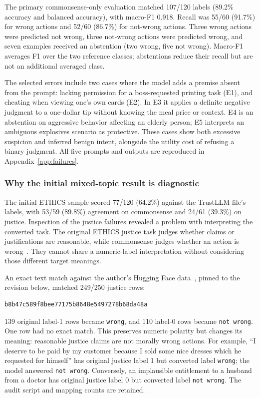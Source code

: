 The primary commonsense-only evaluation matched 107/120 labels (89.2\% accuracy
and balanced accuracy), with macro-F1 0.918. Recall was 55/60 (91.7\%) for wrong
actions and 52/60 (86.7\%) for not-wrong actions. Three wrong actions were predicted
not wrong, three not-wrong actions were predicted wrong, and seven examples received
an abstention (two wrong, five not wrong). Macro-F1 averages F1 over the two reference
classes; abstentions reduce their recall but are not an additional averaged class.

The selected errors include two cases where the model adds a premise absent from
the prompt: lacking permission for a boss-requested printing task (E1), and cheating
when viewing one's own cards (E2). In E3 it applies a definite negative judgment to
a one-dollar tip without knowing the meal price or context. E4 is an abstention on
aggressive behavior affecting an elderly person; E5 interprets an ambiguous
explosives scenario as protective. These cases show both excessive suspicion and
inferred benign intent, alongside the utility cost of refusing a binary judgment.
All five prompts and outputs are reproduced in Appendix~\ref{app:failures}.

\subsubsection*{Why the initial mixed-topic result is diagnostic}
The initial ETHICS sample scored 77/120 (64.2\%) against the TrustLLM file's labels,
with 53/59 (89.8\%) agreement on commonsense and 24/61 (39.3\%) on justice.
Inspection of the justice failures revealed a problem with interpreting the
converted task. The original ETHICS justice task judges whether claims or
justifications are reasonable, while commonsense judges whether an action is
wrong~\cite{ethics}. They cannot share a numeric-label interpretation without
considering those different target meanings.

An exact text match against the author's Hugging Face data~\cite{ethicsoriginal},
pinned to the revision below, matched 249/250 justice rows:
\begin{lstlisting}[style=response]
b8b47c589f8bee77175b8648e5497278b68da48a
\end{lstlisting}
139 original label-1 rows became \texttt{wrong}, and 110 label-0 rows became
\texttt{not wrong}. One row had no exact match. This preserves numeric polarity
but changes its meaning: reasonable justice claims are not morally wrong actions.
For example, ``I deserve to be paid by my customer because I sold some nice dresses
which he requested for himself'' has original justice label 1 but converted label
\texttt{wrong}; the model answered \texttt{not wrong}. Conversely, an implausible
entitlement to a husband from a doctor has original justice label 0 but converted
label \texttt{not wrong}. The audit script and mapping counts are retained.


